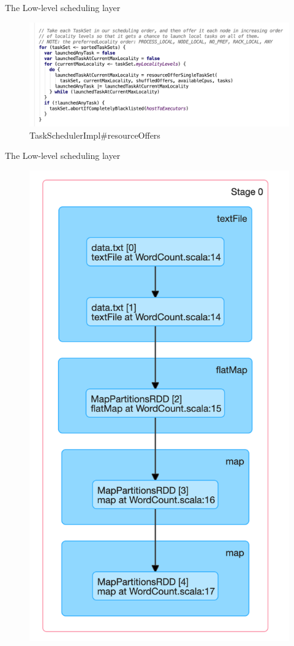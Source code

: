 \begin{frame}[plain,t]{The Low-level scheduling layer} %
	 \\  \vspace{2ex}
	\begin{figure}
		\centering
		\includegraphics[width=0.9\linewidth]{images/tasksch0001}
		\caption{TaskSchedulerImpl\#resourceOffers}
		\label{fig:tasksch0001}
	\end{figure}
	
\end{frame}
\begin{frame}[plain,t]{The Low-level scheduling layer} %
	 \\  
	\begin{figure}
		\centering
		\includegraphics[width=0.4\linewidth]{images/p006}
		\label{fig:p006}
	\end{figure}
\end{frame}
